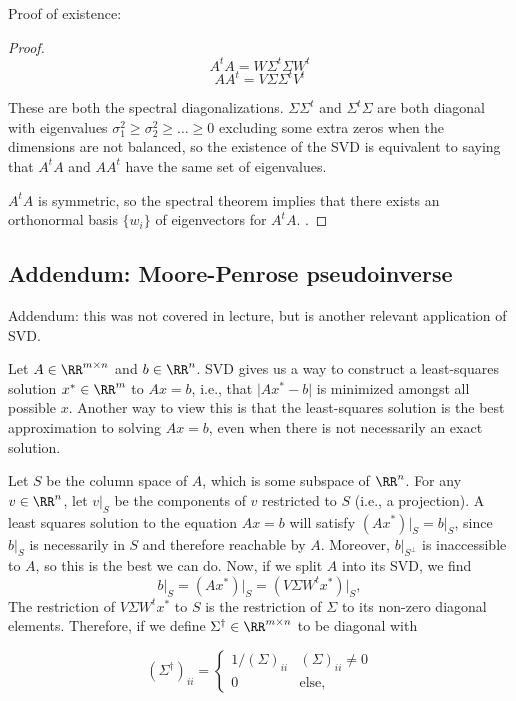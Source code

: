 Proof of existence:
\begin{proof}
\[A^tA = W\Sigma^t \Sigma W^t\]
\[AA^t = V\Sigma \Sigma^t V^t\]

These are both the spectral diagonalizations. $\Sigma \Sigma^t$ and $\Sigma^t\Sigma$ are both diagonal with eigenvalues $\sigma_1^2\geq \sigma_2^2\geq \hdots\geq 0$ excluding some extra zeros when the dimensions are not balanced, so the existence of the SVD is equivalent to saying that $A^tA$ and $AA^t$ have the same set of eigenvalues. 

$A^tA$ is symmetric, so the spectral theorem implies that there exists an orthonormal basis $\{w_i\}$ of eigenvectors for $A^tA$. . 
\end{proof}

\subsection{Addendum: Moore-Penrose pseudoinverse}

Addendum: this was not covered in lecture, but is another relevant application of SVD. 

Let $A\in \RR^{m\times n}$ and $b\in \RR^n$. SVD gives us a way to construct a least-squares solution $x^*\in \RR^m$ to $Ax=b$, i.e., that $\vert Ax^*-b\vert$ is minimized amongst all possible $x$. Another way to view this is that the least-squares solution is the best approximation to solving $Ax=b$, even when there is not necessarily an exact solution. 

Let $S$ be the column space of $A$, which is some subspace of $\RR^n$. For any $v\in \RR^n$, let $v\vert_S$ be the components of $v$ restricted to $S$ (i.e., a projection). A least squares solution to the equation $Ax=b$ will satisfy $(Ax^*)\vert_S = b\vert_S$, since $b\vert_S$ is necessarily in $S$ and therefore reachable by $A$. Moreover, $b\vert_{S^{\perp}}$ is inaccessible to $A$, so this is the best we can do. Now, if we split $A$ into its SVD, we find
\[b\vert_S = (Ax^*)\vert_S = (V\Sigma W^tx^*)\vert_S,\]
The restriction of $V\Sigma W^tx^*$ to $S$ is the restriction of $\Sigma$ to its non-zero diagonal elements. Therefore, if we define $\Sigma^\dagger\in \RR^{m\times n}$ to be diagonal with 

\[(\Sigma^\dagger)_{ii} = \begin{cases}1/(\Sigma)_{ii} & (\Sigma)_{ii}\neq 0 \\ 0 & \text{else},\end{cases}\]

